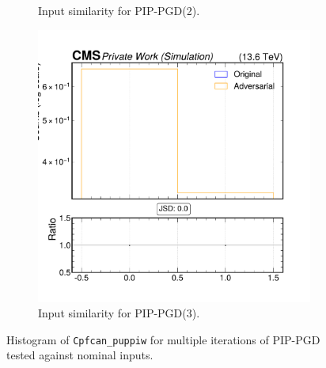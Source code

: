 \begin{figure}[htbp]
\begin{subfigure}[t]{0.32\textwidth}
    \caption*{Input similarity for PIP-PGD(2).}
  \end{subfigure}\hfill
  \begin{subfigure}[t]{0.32\textwidth}
    \includegraphics[width=\linewidth]{media/output/features/compare/combined_it_3/cmp_cpf_arr_Cpfcan_puppiw.pdf}
    \caption*{Input similarity for PIP-PGD(3).}
  \end{subfigure}

  \caption*{Histogram of \texttt{Cpfcan\_puppiw} for multiple iterations of PIP-PGD tested against nominal inputs.}
  \label{fig:combined_input_Cpfcan_puppiw}
\end{figure}

